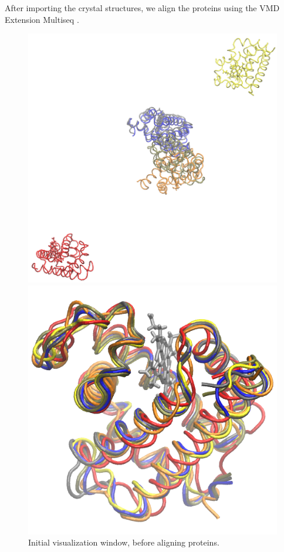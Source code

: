 \documentclass{article}
\begin{document}
After importing the crystal structures, we align the proteins using the VMD Extension Multiseq \cite{multiseq}.

\begin{figure}
  \centering
  \begin{minipage}{0.4\textwidth}
    \centering
    \includegraphics[width=\linewidth]{loadalign.png}
    \caption{Initial visualization window, before aligning proteins.}
    \label{fig:loadalign}
  \end{minipage}
  \hfill
  \begin{minipage}{0.5\textwidth}
    \centering
    \includegraphics[width=\linewidth]{multiseq.png}

\end{minipage}
\end{figure}
\end{document}
